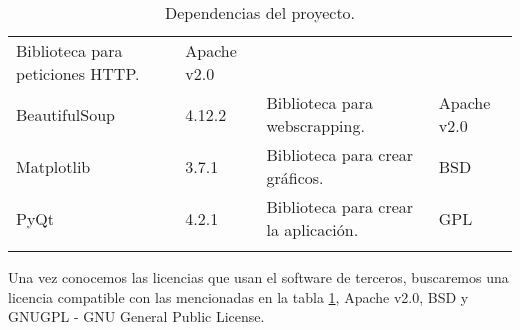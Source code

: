 \begin{longtable}[]{@{}llll@{}}
\begin{minipage}[t]{0.49\columnwidth}
Biblioteca para peticiones HTTP.\strut
\end{minipage} & \begin{minipage}[t]{0.11\columnwidth}\raggedright\strut
Apache v2.0\strut
\end{minipage}\tabularnewline
\begin{minipage}[t]{0.18\columnwidth}\raggedright\strut
BeautifulSoup\strut
\end{minipage} & \begin{minipage}[t]{0.08\columnwidth}\raggedright\strut
4.12.2\strut
\end{minipage} & \begin{minipage}[t]{0.49\columnwidth}\raggedright\strut
Biblioteca para webscrapping.\strut
\end{minipage} & \begin{minipage}[t]{0.11\columnwidth}\raggedright\strut
Apache v2.0\strut
\end{minipage}\tabularnewline
\begin{minipage}[t]{0.18\columnwidth}\raggedright\strut
Matplotlib\strut
\end{minipage} & \begin{minipage}[t]{0.08\columnwidth}\raggedright\strut
3.7.1\strut
\end{minipage} & \begin{minipage}[t]{0.49\columnwidth}\raggedright\strut
Biblioteca para crear gráficos.\strut
\end{minipage} & \begin{minipage}[t]{0.11\columnwidth}\raggedright\strut
BSD\strut
\end{minipage}\tabularnewline
\begin{minipage}[t]{0.18\columnwidth}\raggedright\strut
PyQt\strut
\end{minipage} & \begin{minipage}[t]{0.08\columnwidth}\raggedright\strut
4.2.1\strut
\end{minipage} & \begin{minipage}[t]{0.49\columnwidth}\raggedright\strut
Biblioteca para crear la aplicación.\strut
\end{minipage} & \begin{minipage}[t]{0.11\columnwidth}\raggedright\strut
GPL\strut
\end{minipage}\tabularnewline
\bottomrule
\caption{Dependencias del proyecto.}
\label{librarylicensetable}
\end{longtable}

Una vez conocemos las licencias que usan el software de terceros, buscaremos una licencia compatible con las mencionadas en la tabla \ref{librarylicensetable}, Apache v2.0, BSD y GNUGPL - GNU General Public License.

